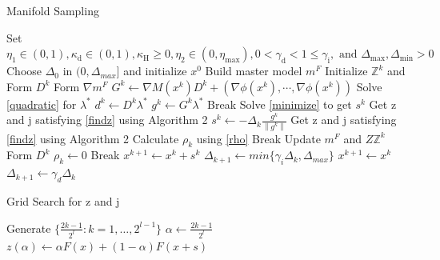 \documentclass[10pt, oneside]{article}
\begin{document}
\begin{algorithm}
        \caption{Manifold Sampling}
        \label{algorithm1}
        \begin{algorithmic}[1] %
\State  Set $\eta_{1} \in(0,1), \kappa_{\mathrm{d}} \in(0,1), \kappa_{\mathrm{H}} \geq 0, \eta_{2} \in\left(0, \eta_{\max }\right), 0<\gamma_{\mathrm{d}}<1 \leq \gamma_{\mathrm{i}}, \text { and } \Delta_{\max }, \Delta_{\min }>0$
\State Choose $\Delta_0$ in $(0,\Delta_{max}]$ and initialize $x^0$
		  \State Build master model $m^F$
		  \State Initialize $\mathbb{Z}^k$ and Form $D^k$
		  \State Form $\nabla m^F$
		  \State $G^{k} \gets \nabla M\left(x^{k}\right) D^{k}+(\nabla \phi(x^k),\cdots,\nabla \phi(x^k))$
		  \State Solve \ref{quadratic} for $\lambda^*$
		  \State $d^k\gets D^k \lambda^*$
		  \State $g^k\gets G^k\lambda^*$
		  \State Break
		  \EndIf
		  \State Solve \ref{minimize} to get $s^k$
		  \State Get z and j satisfying \ref{findz} using Algorithm 2
		  \State $s^k\gets -\Delta_{k} \frac{g^{k}}{\left\|g^{k}\right\|}$
		  \State Get z and j satisfying \ref{findz} using Algorithm 2
		  \EndIf
		  \State Calculate $\rho_k$ using \ref{rho}
		  \State Break
		  \Else
		  \State Update $m^F$ and $Z\mathbb{Z}^k$
		  \State Form $D^k$
		  \EndIf
		  \Else
		  \State $\rho_k\gets 0$
		  \State Break
		  \EndIf
		  \EndWhile
		  \State $x^{k+1}\gets x^k+s^k$
		  \State $\Delta_{k+1}\gets min\{\gamma_i\Delta_k,\Delta_{max}\}$
		  \Else
		  \State $x^{k+1}\gets x^k$
		  \State $\Delta_{k+1}\gets \gamma_d\Delta_k$
		  \EndIf
		  \EndFor
		  
\end{algorithmic}
\end{algorithm}


\begin{algorithm}	
	
        \caption{Grid Search for z and j}
        \label{algorithm2}
        \begin{algorithmic}[1] %
        \State{}
        \EndIf
        \State{}
        \EndIf
        \State Generate $\{\frac{2 k-1}{2^{l}}: k=1, \ldots, 2^{l-1}\}$
        \State $\alpha\gets\frac{2k-1}{2^l}$
        \State $z(\alpha)\gets\alpha F(x)+(1-\alpha)F(x+s)$
        \State{}
        \EndIf
        
        \EndFor
        \EndFor
\end{algorithmic}
\end{algorithm}
\end{document}
